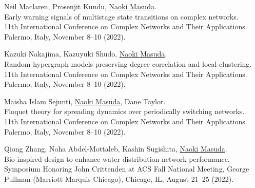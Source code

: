 \documentclass[11pt,letter]{article}
\begin{document}
\begin{etaremune}
\item Neil Maclaren, Prosenjit Kundu, \underline{Naoki Masuda}.\\
Early warning signals of multistage state transitions on complex networks.\\
11th International Conference on Complex Networks and Their Applications.\\
Palermo, Italy, November 8--10 (2022).

\item Kazuki Nakajima, Kazuyuki Shudo, \underline{Naoki Masuda}.\\
Random hypergraph models preserving degree correlation and local clustering.\\
11th International Conference on Complex Networks and Their Applications.\\
Palermo, Italy, November 8--10 (2022).

\item Maisha Islam Sejunti, \underline{Naoki Masuda}, Dane Taylor.\\
Floquet theory for spreading dynamics over periodically switching networks.\\
11th International Conference on Complex Networks and Their Applications.\\
Palermo, Italy, November 8--10 (2022).

\item Qiong Zhang, Noha Abdel-Mottaleb, Kashin Sugishita, \underline{Naoki Masuda}.\\
Bio-inspired design to enhance water distribution network performance.\\
Symposium Honoring John Crittenden at ACS Fall National Meeting, George Pullman (Marriott Marquis Chicago), Chicago, IL, August 21--25 (2022).


%
%

%


\end{etaremune}
\end{document}
